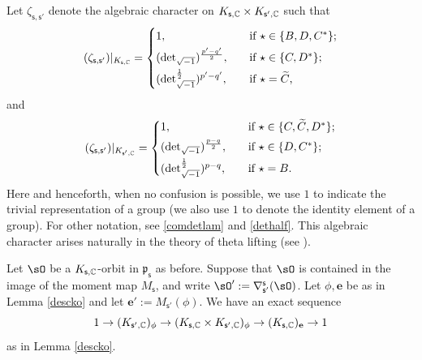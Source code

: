 \documentclass[11pt,a4paper]{amsart}
\newcommand{\p}{\mathfrak p}
\numberwithin{equation}{section}
\theoremstyle{remark}
\begin{document}
Let $\zeta_{\mathsf s, \mathsf s'}$ denote the algebraic character on $K_{\mathsf s, \mathbb{C}}\times K_{\mathsf s', \mathbb{C}}$  such that
\[
 (\zeta_{\mathsf s, \mathsf s'})|_{K_{\mathsf s, \C}}=
   \begin{cases}
    1, \quad & \textrm{if $\star\in \{B, D, C^*\}$}; \smallskip\\
      ({\det}_{\sqrt{-1}})^{\frac{p'-q'}{2}}, \quad & \textrm{if $\star\in \{C, D^*\}$};\smallskip\\
     ({\det}_{\sqrt{-1}}^{\frac{1}{2}})^{p'-q'}, \quad & \textrm{if $\star=\widetilde C$,}\\
  \end{cases}
\]
and
\[
 (\zeta_{\mathsf s, \mathsf s'})|_{K_{\mathsf s', \C}}=
   \begin{cases}
    1, \quad & \textrm{if $\star\in \{C, \widetilde C, D^*\}$}; \smallskip\\
      ({\det}_{\sqrt{-1}})^{\frac{p-q}{2}}, \quad & \textrm{if $\star\in \{D, C^*\}$};\smallskip\\
     ({\det}_{\sqrt{-1}}^{\frac{1}{2}})^{p-q}, \quad & \textrm{if $\star=B$}.
 \end{cases}
\]
Here and henceforth, when no confusion is possible, we  use $1$ to indicate the trivial representation of a group (we also use $1$ to denote the identity element of a group). For other notation, see
\eqref{comdetlam} and \eqref{dethalf}. This algebraic character arises naturally in the theory of theta lifting  (see ).

Let  $\sO$ be a $K_{\mathsf s, \mathbb{C}}$-orbit in $\p_{\mathsf s}$ as before. Suppose that $\sO$ is contained in the image of the moment map $M_{\mathsf s}$, and write $\sO':=\nabla^{\mathsf s}_{\mathsf s'}(\sO)$.
Let $\phi,\mathbf e$ be as in Lemma  \ref{descko} and let $\mathbf e':=M_{\mathsf s'}(\phi)$. We have an exact sequence
\[
  1\rightarrow  (K_{\mathsf s',\mathbb{C}})_\phi\rightarrow (K_{\mathsf s,\mathbb{C}}\times K_{\mathsf s', \mathbb{C}})_\phi\rightarrow (K_{\mathsf s,\mathbb{C}})_{\mathbf e}\rightarrow 1
\]
as in Lemma  \ref{descko}.
\end{document}
